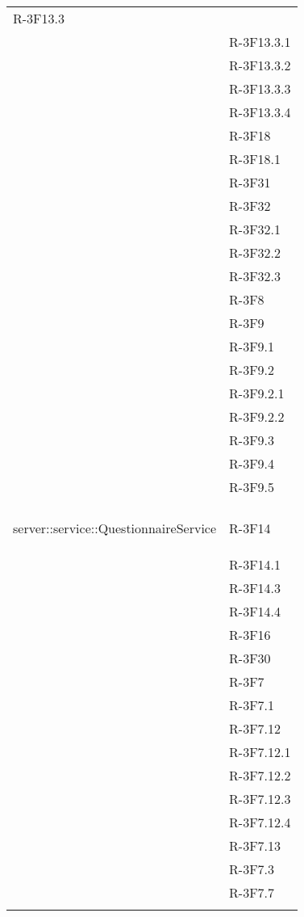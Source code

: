 \begin{longtable}{l p{3cm}}
	R-3F13.3 \tabularnewline &
	
	R-3F13.3.1 \tabularnewline &
	
	R-3F13.3.2 \tabularnewline &
	
	R-3F13.3.3 \tabularnewline &
	
	R-3F13.3.4 \tabularnewline &
	
	R-3F18 \tabularnewline &
	
	R-3F18.1 \tabularnewline &
	
	R-3F31 \tabularnewline &
	
	R-3F32 \tabularnewline &
	
	R-3F32.1 \tabularnewline &
	
	R-3F32.2 \tabularnewline &
	
	R-3F32.3 \tabularnewline &
	
	R-3F8 \tabularnewline &
	
	R-3F9 \tabularnewline &
	
	R-3F9.1 \tabularnewline &
	
	R-3F9.2 \tabularnewline &
	
	R-3F9.2.1 \tabularnewline &
	
	R-3F9.2.2 \tabularnewline &
	
	R-3F9.3 \tabularnewline &
	
	R-3F9.4 \tabularnewline &
	
	R-3F9.5 \tabularnewline &\tabularnewline
	\hline
	\hypertarget{server::service::QuestionnaireService}{server::service::QuestionnaireService} & R-3F14 \tabularnewline &
	
	R-3F14.1 \tabularnewline &
	
	R-3F14.3 \tabularnewline &
	
	R-3F14.4 \tabularnewline &
	
	R-3F16 \tabularnewline &
	
	R-3F30 \tabularnewline &
	
	R-3F7 \tabularnewline &
	
	R-3F7.1 \tabularnewline &
	
	R-3F7.12 \tabularnewline &
	
	R-3F7.12.1 \tabularnewline &
	
	R-3F7.12.2 \tabularnewline &
	
	R-3F7.12.3 \tabularnewline &
	
	R-3F7.12.4 \tabularnewline &
	
	R-3F7.13 \tabularnewline &
	
	R-3F7.3 \tabularnewline &
	
	R-3F7.7 \tabularnewline &
	

\end{longtable}
